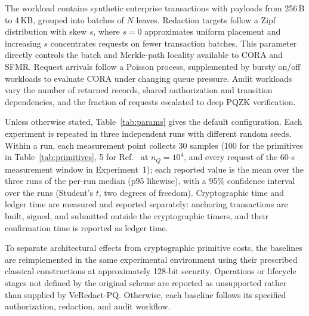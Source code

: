 \documentclass[lettersize,journal]{IEEEtran}
\begin{document}
The workload contains synthetic enterprise transactions with payloads
from 256\,B to 4\,KB, grouped into batches of $N$ leaves. Redaction
targets follow a Zipf distribution with skew $s$, where $s=0$
approximates uniform placement and increasing $s$ concentrates requests
on fewer transaction batches. This parameter directly controls the
batch and Merkle-path locality available to CORA and SFMR. Request
arrivals follow a Poisson process, supplemented by bursty on/off
workloads to evaluate CORA under changing queue pressure. Audit
workloads vary the number of returned records, shared authorization and
transition dependencies, and the fraction of requests escalated to
deep PQZK verification.

Unless otherwise stated, Table~\ref{tab:params} gives the default
configuration. Each experiment is repeated in three independent runs
with different random seeds. Within a run, each measurement point
collects 30 samples (100 for the primitives in Table~\ref{tab:primitives},
5 for Ref.~\cite{ref13} at $n_Q=10^4$, and every request of the 60-s
measurement window in Experiment~1); each reported value is the mean
over the three runs of the per-run median (p95 likewise), with a 95\%
confidence interval over the runs (Student's $t$, two degrees of
freedom).
\textcolor{e2}{Cryptographic time and ledger time are measured and
reported separately: anchoring transactions are built, signed, and
submitted outside the cryptographic timers, and their confirmation time
is reported as ledger time.}

To separate architectural effects from cryptographic primitive costs,
the baselines are reimplemented in the same experimental environment
using their prescribed classical constructions at approximately
128-bit security. Operations or lifecycle stages not defined by the
original scheme are reported as unsupported rather than supplied by
VeRedact-PQ. Otherwise, each baseline follows its specified
authorization, redaction, and audit workflow.
\end{document}

